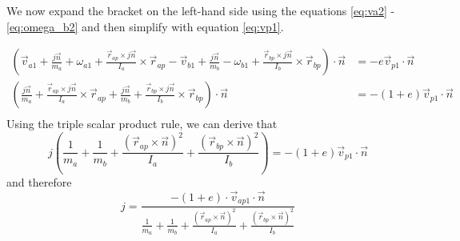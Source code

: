 We now expand the bracket on the left-hand side using the equations \ref{eq:va2}
- \ref{eq:omega_b2} and then simplify with equation \ref{eq:vp1}.

\[
	\begin{split}
		\left( \vec v_{a1} +  \frac{j\vec n}{m_a} + \omega_{a1} + \frac{\vec r_{ap} \times j\vec n}{I_a} \times \vec r_{ap} - \vec v_{b1} +  \frac{j\vec n}{m_b} - \omega_{b1} + \frac{\vec r_{bp} \times j\vec n}{I_b} \times \vec r_{bp} \right)\cdot \vec n &= - e \vec v_{p1} \cdot \vec n\\
		\left( \frac{j\vec n}{m_a} + \frac{\vec r_{ap} \times j\vec n}{I_a} \times \vec r_{ap} +  \frac{j\vec n}{m_b} + \frac{\vec r_{bp} \times j\vec n}{I_b} \times \vec r_{bp} \right)\cdot \vec n &= - (1+e) \vec v_{p1} \cdot \vec n\\
	\end{split}
\]
Using the triple scalar product rule, we can derive that
\[
	j \left( \frac{1}{m_a} + \frac{1}{m_b} + \frac{\left(\vec r_{ap} \times \vec n\right)^2}{I_a} + \frac{\left( \vec r_{bp} \times \vec n \right)^2}{I_b}
	\right) = -(1+e) \vec v_{p1} \cdot \vec n
\]
and therefore
\begin{equation}
	j = \frac{ - (1+e) \cdot \vec v_{ap1} \cdot \vec n }{\frac{1}{m_a} + \frac{1}{m_b} +
		\frac{\left( \vec r_{ap} \times \vec n \right)^2}{I_a} + \frac{\left( \vec
			r_{bp} \times \vec n \right)^2}{I_b}}
\end{equation}
